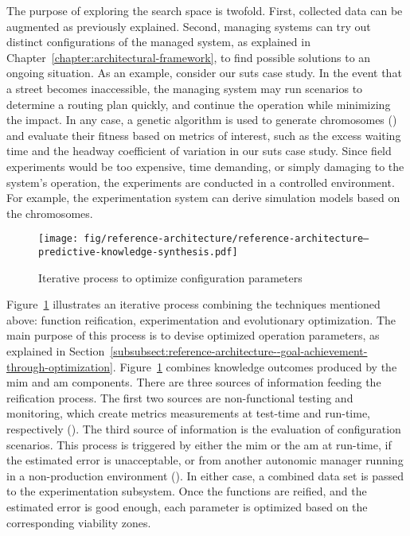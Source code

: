 The purpose of exploring the search space is twofold. First, collected data can be augmented as previously explained. Second, managing systems can try out distinct configurations of the managed system, as explained in Chapter~\ref{chapter:architectural-framework}, to find possible solutions to an ongoing situation. As an example, consider our \gls{suts} case study. In the event that a street becomes inaccessible, the managing system may run scenarios to determine a routing plan quickly, and continue the operation while minimizing the impact. In any case, a genetic algorithm is used to generate chromosomes () and evaluate their fitness based on metrics of interest, such as the excess waiting time and the headway coefficient of variation in our \gls{suts} case study. Since field experiments would be too expensive, time demanding, or simply damaging to the system's operation, the experiments are conducted in a controlled environment. For example, the experimentation system can derive simulation models based on the chromosomes.

\begin{figure}[h]
	\centering
	\texttt{[image: fig/reference-architecture/reference-architecture--predictive-knowledge-synthesis.pdf]}
	\caption{Iterative process to optimize configuration parameters}
	\label{fig:reference-architecture--knowledge-reification}
\end{figure}

Figure~\ref{fig:reference-architecture--knowledge-reification} illustrates an iterative process combining the techniques mentioned above: function reification, experimentation and evolutionary optimization. The main purpose of this process is to devise optimized operation parameters, as explained in Section~\ref{subsubsect:reference-architecture--goal-achievement-through-optimization}. Figure~\ref{fig:reference-architecture--knowledge-reification} combines knowledge outcomes produced by the \gls{mim} and \gls{am} components. There are three sources of information feeding the reification process. The first two sources are non-functional testing and monitoring, which create metrics measurements at test-time and run-time, respectively (). The third source of information is the evaluation of configuration scenarios. This process is triggered by either the \gls{mim} or the \gls{am} at run-time, if the estimated error is unacceptable, or from another autonomic manager running in a non-production environment (). In either case, a combined data set is passed to the experimentation subsystem. Once the functions are reified, and the estimated error is good enough, each parameter is optimized based on the corresponding viability zones.


